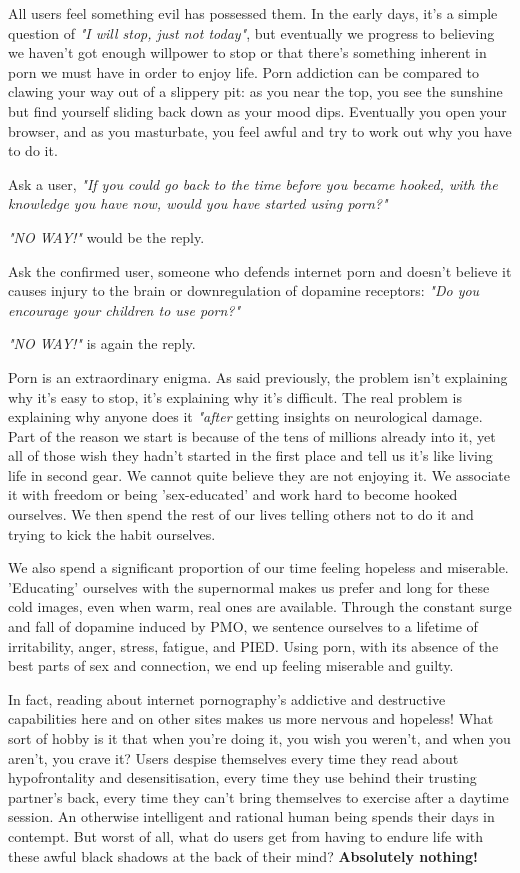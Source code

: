 \documentclass[easypeasy.tex]{subfiles}
\begin{document}
All users feel something evil has possessed them. In the early days, it's a simple question of \textit{"I will stop, just not today"}, but eventually we progress to believing we haven't got enough willpower to stop or that there's something inherent in porn we must have in order to enjoy life. Porn addiction can be compared to clawing your way out of a slippery pit: as you near the top, you see the sunshine but find yourself sliding back down as your mood dips. Eventually you open your browser, and as you masturbate, you feel awful and try to work out why you have to do it.

Ask a user, \textit{"If you could go back to the time before you became hooked, with the knowledge you have now, would you have started using porn?"}

\textit{"NO WAY!"} would be the reply.

Ask the confirmed user, someone who defends internet porn and doesn't believe it causes injury to the brain or downregulation of dopamine receptors: \textit{"Do you encourage your children to use porn?"}

\textit{"NO WAY!"} is again the reply.

Porn is an extraordinary enigma. As said previously, the problem isn't explaining why it's easy to stop, it's explaining why it's difficult. The real problem is explaining why anyone does it \textit{"after} getting insights on neurological damage. Part of the reason we start is because of the tens of millions already into it, yet all of those wish they hadn't started in the first place and tell us it's like living life in second gear. We cannot quite believe they are not enjoying it. We associate it with freedom or being 'sex-educated' and work hard to become hooked ourselves. We then spend the rest of our lives telling others not to do it and trying to kick the habit ourselves.

We also spend a significant proportion of our time feeling hopeless and miserable. 'Educating' ourselves with the supernormal makes us prefer and long for these cold images, even when warm, real ones are available. Through the constant surge and fall of dopamine induced by PMO, we sentence ourselves to a lifetime of irritability, anger, stress, fatigue, and PIED. Using porn, with its absence of the best parts of sex and connection, we end up feeling miserable and guilty.

In fact, reading about internet pornography's addictive and destructive capabilities here and on other sites makes us more nervous and hopeless! What sort of hobby is it that when you're doing it, you wish you weren't, and when you aren't, you crave it? Users despise themselves every time they read about hypofrontality and desensitisation, every time they use behind their trusting partner's back, every time they can't bring themselves to exercise after a daytime session. An otherwise intelligent and rational human being spends their days in contempt. But worst of all, what do users get from having to endure life with these awful black shadows at the back of their mind? \textbf{Absolutely nothing!}
\end{document}
